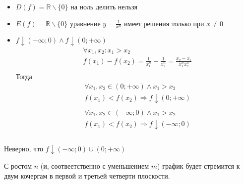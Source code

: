 \begin{itemize}
    \item $D(f) = \mathbb{R} \backslash \{0\}$
    на ноль делить нельзя
    \item $E(f) = \mathbb{R} \backslash \{0\}$
    уравнение $y = \frac{1}{x^n}$ имеет решения только при $x \neq 0$ 
    \item $f \downarrow (-\infty; 0) \land f \downarrow (0; +\infty)$
    \begin{align*}
        &\forall x_1, x_2 : x_1 > x_2 \\
        &f(x_1) - f(x_2) = \frac{1}{x_1^n} - \frac{1}{x_2^n} = \frac{x_2 - x_1}{x_1^n x_2^n}\\
    \end{align*}
    Тогда
    \begin{align*}
        &\forall x_1, x_2 \in (0; +\infty) \land x_1 > x_2 \\
        &f(x_1) < f(x_2) \Rightarrow f \downarrow (0; +\infty) \\ \\
        &\forall x_1, x_2 \in (-\infty; 0) \land x_1 > x_2 \\
        &f(x_1) < f(x_2) \Rightarrow f \downarrow (-\infty; 0) \\ \\
    \end{align*}
\end{itemize}

\begin{remark}
    Неверно, что $f \downarrow (-\infty; 0) \cup (0; +\infty)$
\end{remark}

\begin{remark}
    С ростом $n$ (и, соотвеетственно с уменьшением $m$) график будет стремится к двум кочергам в первой и третьей четверти плоскости.
\end{remark}

